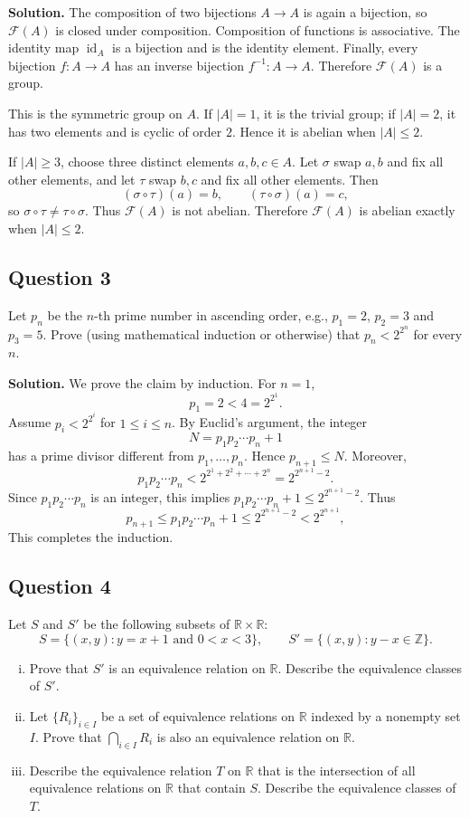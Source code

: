 \documentclass{article}
\newcommand{\R}{\mathbb{R}}
\newcommand{\Z}{\mathbb{Z}}
\newenvironment{solution}{\par\noindent\textbf{Solution.}\quad}{\par}
\begin{document}
\begin{solution}
The composition of two bijections $A\to A$ is again a bijection, so
$\mathcal F(A)$ is closed under composition. Composition of functions is
associative. The identity map $\operatorname{id}_A$ is a bijection and is
the identity element. Finally, every bijection $f:A\to A$ has an inverse
bijection $f^{-1}:A\to A$. Therefore $\mathcal F(A)$ is a group.

This is the symmetric group on $A$. If $|A|=1$, it is the trivial group; if
$|A|=2$, it has two elements and is cyclic of order $2$. Hence it is
abelian when $|A|\le 2$.

If $|A|\ge3$, choose three distinct elements $a,b,c\in A$. Let
$\sigma$ swap $a,b$ and fix all other elements, and let $\tau$ swap $b,c$
and fix all other elements. Then
\[
  (\sigma\circ\tau)(a)=b,\qquad
  (\tau\circ\sigma)(a)=c,
\]
so $\sigma\circ\tau\ne\tau\circ\sigma$. Thus $\mathcal F(A)$ is not
abelian. Therefore $\mathcal F(A)$ is abelian exactly when $|A|\le2$.
\end{solution}

\subsection{Question 3}
Let $p_n$ be the $n$-th prime number in ascending order, e.g., $p_1 = 2$, $p_2 = 3$ and $p_3 = 5$. Prove (using mathematical induction or otherwise) that $p_n < 2^{2^n}$ for every $n$.

\begin{solution}
We prove the claim by induction. For $n=1$,
\[
  p_1=2<4=2^{2^1}.
\]
Assume $p_i<2^{2^i}$ for $1\le i\le n$. By Euclid's argument, the integer
\[
  N=p_1p_2\cdots p_n+1
\]
has a prime divisor different from $p_1,\ldots,p_n$. Hence
$p_{n+1}\le N$. Moreover,
\[
  p_1p_2\cdots p_n
  <2^{2^1+2^2+\cdots+2^n}
  =2^{2^{n+1}-2}.
\]
Since $p_1p_2\cdots p_n$ is an integer, this implies
$p_1p_2\cdots p_n+1\le 2^{2^{n+1}-2}$. Thus
\[
  p_{n+1}\le p_1p_2\cdots p_n+1
  \le 2^{2^{n+1}-2}<2^{2^{n+1}},
\]
This completes the induction.
\end{solution}

\subsection{Question 4}
Let $S$ and $S'$ be the following subsets of $\R \times \R$:
\[
  S = \{(x, y) : y = x + 1 \text{ and } 0 < x < 3\},
  \qquad
  S' = \{(x, y) : y - x \in \Z\}.
\]
\begin{enumerate}[(i)]
  \item Prove that $S'$ is an equivalence relation on $\R$. Describe the equivalence classes of $S'$.
  \item Let $\{R_i\}_{i \in I}$ be a set of equivalence relations on $\R$ indexed by a nonempty set $I$. Prove that $\bigcap_{i \in I} R_i$ is also an equivalence relation on $\R$.
  \item Describe the equivalence relation $T$ on $\R$ that is the intersection of all equivalence relations on $\R$ that contain $S$. Describe the equivalence classes of $T$.
\end{enumerate}
\end{document}
